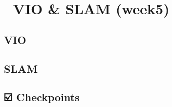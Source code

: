 \documentclass[]{article}
\begin{document}
\section{🚧 VIO \& SLAM (week5)}\label{header-n1094}

\subsection{VIO}\label{header-n1095}

\subsection{SLAM}\label{header-n1096}

\subsection{☑️ Checkpoints}\label{header-n1097}
\end{document}
